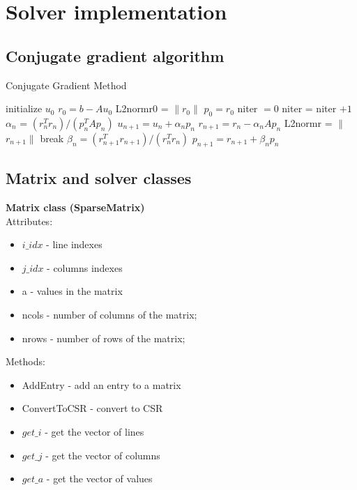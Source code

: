 \documentclass[12pt,a4paper]{article}
\begin{document}
\section{Solver implementation}

\subsection{Conjugate gradient algorithm}
\begin{algorithm}
\caption{Conjugate Gradient Method}
\begin{algorithmic}	
	\STATE initialize $u_0$
	\STATE $r_0 = b-Au_0$
	\STATE L2normr0 = $\lVert$$r_0$$\rVert$
	\STATE $p_0 = r_0$
	\STATE niter $=0$
		\STATE niter = niter $+1$
		\STATE $\alpha$$_n$ = $(r_n^Tr_n)/(p_n^TAp_n)$
		\STATE $u_{n+1} = u_n+\text{$\alpha$}_np_n$
		\STATE $r_{n+1} = r_n - \text{$\alpha$}_nAp_n$
		\STATE L2normr = $\lVert$$r_{n+1}$$\rVert$
		\STATE break
		\ENDIF
		\STATE $\text{$\beta$}_n = (r_{n+1}^Tr_{n+1})/(r_n^Tr_n)$
		\STATE $p_{n+1} = r_{n+1} + \text{$\beta$}_np_n$
		
	\ENDWHILE
\end{algorithmic}
\end{algorithm}


\subsection{Matrix and solver classes}

\textbf{Matrix class (SparseMatrix)} \\
Attributes:
\begin{itemize}
    \item $i\_idx$ - line indexes
    \item $j\_idx$ - columns indexes
    \item a - values in the matrix
    \item ncols - number of columns of the matrix;
    \item nrows - number of rows of the matrix;
\end{itemize}

Methods:
\begin{itemize}
    \item AddEntry - add an entry to a matrix
    \item ConvertToCSR - convert to CSR
    \item $get\_i$ - get the vector of lines
    \item $get\_j$ - get the vector of columns
    \item $get\_a$ - get the vector of values
\end{itemize}
\end{document}
